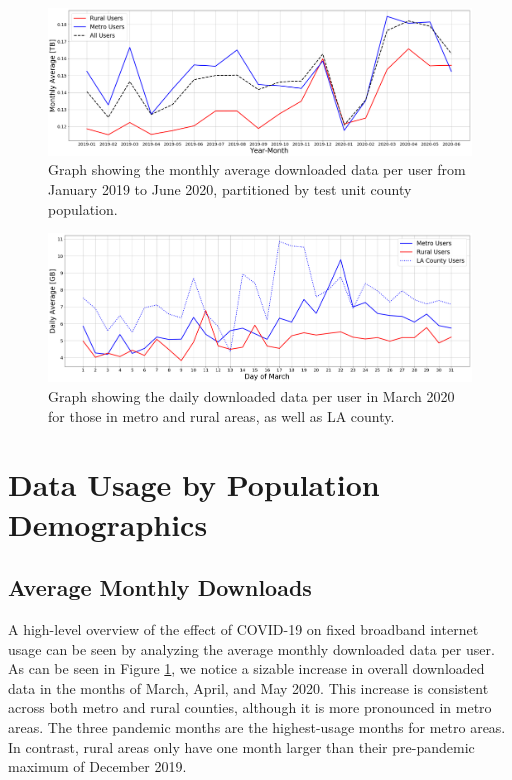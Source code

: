 \begin{figure}[t]
    \centering
    \includegraphics[width=1.0\linewidth]{figs/monthly_downloaded_data_notitle.png}
    \caption{Graph showing the monthly average downloaded data per user from January 2019 to June 2020, partitioned by test unit county population.}
    \label{fig:downloadmetro_rural}
\end{figure}

\begin{figure}[t]
    \centering
    \includegraphics[width=1.0\linewidth]{figs/daily_downloaded_data_notitle.png}
    \caption{Graph showing the daily downloaded data per user in March 2020 for those in metro and rural areas, as well as LA county.}
    \label{fig:dailymetro_rural}
\end{figure}

\section{Data Usage by Population Demographics}

\subsection{Average Monthly Downloads}

A high-level overview of the effect of COVID-19 on fixed broadband internet usage can be seen by analyzing the average monthly downloaded data per user. As can be seen in Figure \ref{fig:downloadmetro_rural}, we notice a sizable increase in overall downloaded data in the months of March, April, and May 2020. This increase is consistent across both metro and rural counties, although it is more pronounced in metro areas. The three pandemic months are the highest-usage months for metro areas. In contrast, rural areas only have one month larger than their pre-pandemic maximum of December 2019. 

